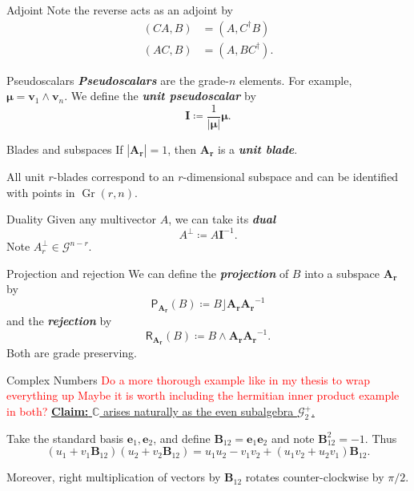 \documentclass[aspectratio=169,handout]{beamer}
\newcommand\boldgreen[1]{\textcolor{lighter_csu_green}{\emph{\textbf{#1}}}}
\newcommand{\C}{\mathbb{C}}
\newcommand{\G}{\mathcal{G}}
\newcommand{\Grassmannian}[2]{\operatorname{Gr}(#1,#2)}
\newcommand{\projection}{\mathsf{P}}
\newcommand{\rejection}{\mathsf{R}}
\newcommand{\blade}[1]{\boldsymbol{#1}}
\newcommand{\pseudoscalar}{\blade{I}}
\newcommand{\bivector}{\blade{B}}
\begin{document}
\begin{frame}{Adjoint}
Note the reverse acts as an adjoint by
\begin{align}
(CA,B) &= (A,C^\dagger B)\\
(AC,B) &= (A,BC^\dagger).
\end{align}
\end{frame}

\begin{frame}{Pseudoscalars}
\boldgreen{Pseudoscalars} are the grade-$n$ elements. For example, $\blade{\mu} = \blade{v}_1 \wedge \blade{v}_n$.  We define the \boldgreen{unit pseudoscalar} by 
\[
\pseudoscalar \coloneqq \frac{1}{|\blade{\mu}|} \blade{\mu}.
\]
\end{frame}

\begin{frame}{Blades and subspaces}
If $|\blade{A_r}|=1$, then $\blade{A_r}$ is a \boldgreen{unit blade}. 

All unit $r$-blades correspond to an $r$-dimensional subspace and can be identified with points in $\Grassmannian{r}{n}$.
\end{frame}

\begin{frame}{Duality}
Given any multivector $A$, we can take its \boldgreen{dual}
\[
A^\perp \coloneqq A \pseudoscalar^{-1}.
\]
Note $A_r^\perp \in \G^{n-r}$.
\end{frame}

\begin{frame}{Projection and rejection}
We can define the \boldgreen{projection} of $B$ into a subspace $\blade{A_r}$ by
\[
\projection_{\blade{A_r}} (B) \coloneqq B\rfloor \blade{A_r}\blade{A_r}^{-1}
\]
and the \boldgreen{rejection} by
\[
\rejection_{\blade{A_r}} (B) \coloneqq B\wedge \blade{A_r}\blade{A_r}^{-1}.
\]
Both are grade preserving.
\end{frame}

\begin{frame}{Complex Numbers}
\textcolor{red}{Do a more thorough example like in my thesis to wrap everything up Maybe it is worth including the hermitian inner product example in both?} 
\vfill
\underline{\textbf{Claim:} $\C$ arises naturally as the even subalgebra $\G_2^+$.}\\
\vspace*{0.25cm}

Take the standard basis $\blade{e}_1,\blade{e}_2$, and define $\bivector_{12}= \blade{e}_1\blade{e}_2$ and note $\bivector_{12}^2 = -1$. Thus
\[
(u_1+v_1 \bivector_{12})(u_2 + v_2 \bivector_{12}) = u_1u_2-v_1 v_2 + (u_1 v_2+u_2v_1)\bivector_{12}.
\]

Moreover, right multiplication of vectors by $\bivector_{12}$ rotates counter-clockwise by $\pi/2$.
\vfill
\end{frame}
\end{document}
